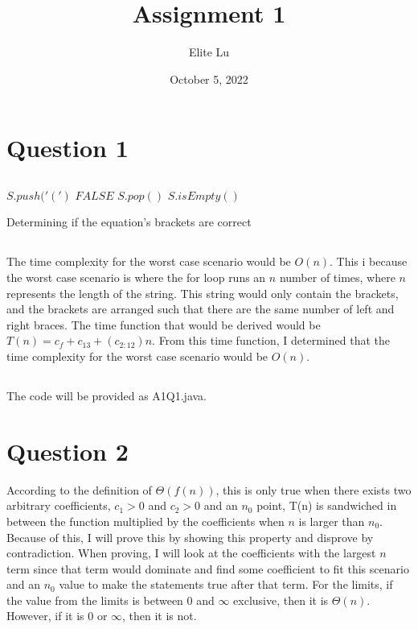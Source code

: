 \documentclass{article}
\title{Assignment 1}
\author{Elite Lu}
\date{October 5, 2022}
\begin{document}
\maketitle

\section{Question 1}
    \subsection{}
    \begin{algorithm}
    \begin{algorithmic}[1]
    		 
    		        \State $S.push('(')$
    		            \State \Return $FALSE$
    		        \Else
    		            \State $S.pop()$
    		        \EndIf
    		    \EndIf
    		\EndFor
    		\State \Return $S.isEmpty()$
    		\EndProcedure
    	\end{algorithmic}
    	\caption{Determining if the equation's brackets are correct}
    \end{algorithm}
    
    \subsection{}
        The time complexity for the worst case scenario would be $O(n)$. This i because the worst case scenario is where the for loop runs an $n$ number of times, where $n$ represents the length of the string. This string would only contain the brackets, and the brackets are arranged such that there are the same number of left and right braces. The time function that would be derived would be $T(n) = c_f + c_{13} + (c_{2:12}) n$. From this time function, I determined that the time complexity for the worst case scenario would be $O(n)$. 
    \subsection{}
        The code will be provided as A1Q1.java.

\section{Question 2}
    According to the definition of $\Theta(f(n))$, this is only true when there exists two arbitrary coefficients, $c_1 > 0$ and $c_2 > 0$ and an $n_0$ point, T(n) is sandwiched in between the function multiplied by the coefficients when $n$ is larger than $n_0$. 
    Because of this, I will prove this by showing this property and disprove by contradiction. When proving, I will look at the coefficients with the largest $n$ term since that term would dominate and find some coefficient to fit this scenario and an $n_0$ value to make the statements true after that term. 
    For the limits, if the value from the limits is between 0 and $\infty$ exclusive, then it is $\Theta(n)$. However, if it is $0$ or $\infty$, then it is not.
    
\end{document}
